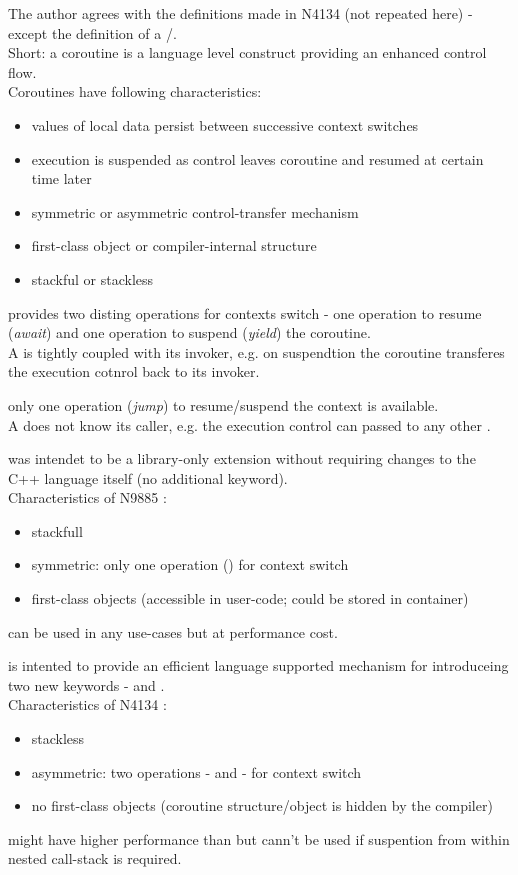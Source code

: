 The author agrees with the definitions made in N4134 (not repeated here) -
except the definition of a \fiber/\uthread.\\
Short: a coroutine is a language level construct providing an enhanced
control flow.\\
\newline
Coroutines have following characteristics\cite{N3985}:
\begin{itemize}
    \item values of local data persist between successive context switches
    \item execution is suspended as control leaves coroutine and resumed at
          certain time later
    \item symmetric or asymmetric control-transfer mechanism
    \item first-class object or compiler-internal structure
    \item stackful or stackless
\end{itemize}

\uabschnitt{\ascoro:}
provides two disting operations for contexts switch - one operation to
resume (\textit{await}) and one operation to suspend (\textit{yield}) the
coroutine.\\
A \ascoro is tightly coupled with its invoker, e.g. on suspendtion the
coroutine transferes the execution cotnrol back to its invoker.

\uabschnitt{\sycoro:}
only one operation (\textit{jump}) to resume/suspend the context is
available.\\
A \sycoro does not know its caller, e.g. the execution control can passed to
any other \sycoro.

was intendet to be a library-only extension without requiring changes to the C++
language itself (no additional keyword).\\
Characteristics of N9885 \sfcoros:
\begin{itemize}
    \item stackfull
    \item symmetric: only one operation () for
          context switch
    \item first-class objects (accessible in user-code; could be stored in
          container)
\end{itemize}
\sfcoros can be used in any use-cases but at performance cost.

is intented to provide an efficient language supported mechanism for \slcoros
introduceing two new keywords - \await and \yield.\\
Characteristics of N4134 \slcoros:
\begin{itemize}
    \item stackless
    \item asymmetric: two operations - \await and \yield - for context switch
    \item no first-class objects (coroutine structure/object is hidden by the
          compiler)
\end{itemize}
\slcoros might have higher performance than \sfcoros but cann't be used if
suspention from within nested call-stack is required.
